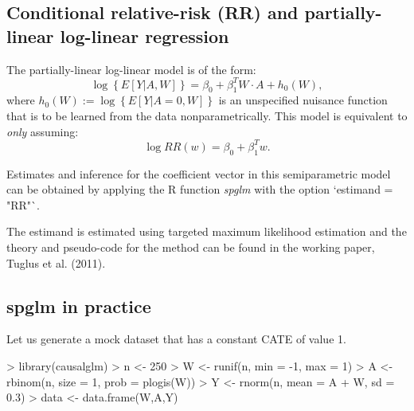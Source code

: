 \documentclass{article}
\begin{document}
\subsection{Conditional relative-risk (RR) and partially-linear log-linear regression}
The partially-linear log-linear model is of the form:
$$\log\left\{E[Y|A,W]\right\} = \beta_0 + \beta_1^T W \cdot A + h_0(W),$$
where $ h_0(W) := \log\left\{E[Y|A=0,W]\right\}$ is an unspecified nuisance function that is to be learned from the data nonparametrically. This model is equivalent to \textit{only} assuming:
$$\log RR(w) = \beta_0 + \beta_1^T w.$$


Estimates and inference for the coefficient vector in this semiparametric model can be obtained by applying the R function \textit{spglm} with the option `estimand = "RR"`.  

The estimand is estimated using targeted maximum likelihood estimation and the theory and pseudo-code for the method can be found in the working paper, Tuglus et al. (2011).\nocite{TMLERR} 

\subsection{spglm in practice}

Let us generate a mock dataset that has a constant CATE of value 1.
\begin{Schunk}
\begin{Sinput}
> library(causalglm)
> n <- 250
> W <- runif(n, min = -1,  max = 1)
> A <- rbinom(n, size = 1, prob = plogis(W))
> Y <- rnorm(n, mean = A + W, sd = 0.3)
> data <- data.frame(W,A,Y)
\end{Sinput}
\end{Schunk}
\end{document}
